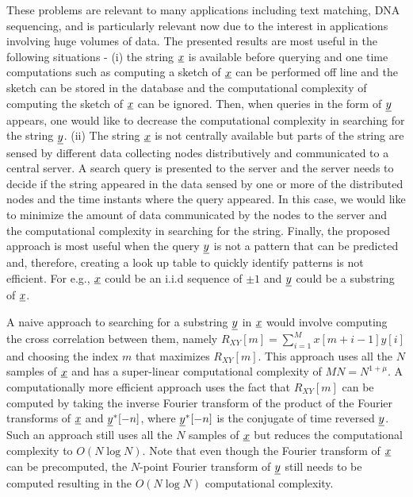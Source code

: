 These problems are relevant to many applications including text matching, DNA sequencing, and is particularly relevant now due to the interest in applications involving huge volumes of data. The presented results are most useful in the following situations - (i) the string $\underline{x}$ is available before querying and one time computations such as computing a sketch of $\underline{x}$ can be performed off line and the sketch can be stored in the database and the computational complexity of computing the sketch of $\underline{x}$ can be ignored. Then, when queries in the form of $\underline{y}$ appears, one would like to decrease the computational complexity in searching for the string $\underline{y}$. (ii) The string $\underline{x}$ is not centrally available but parts of the string are sensed by different data collecting nodes distributively and communicated to a central server. A search query is presented to the server and the server needs to decide if the string appeared in the data sensed by one or more of the distributed nodes and the time instants where the query appeared. In this case, we would like to minimize the amount of data communicated by the nodes to the server and the computational complexity in searching for the string.
Finally, the proposed approach is most useful when the query $\underline{y}$ is not a pattern that can be predicted and, therefore, creating a look up table to quickly identify patterns is not efficient. For e.g., $\underline{x}$ could be an i.i.d sequence of $\pm 1$ and $\underline{y}$ could be a substring of $\underline{x}$.

A naive approach to searching for a substring $\underline{y}$ in $\underline{x}$ would involve computing the cross correlation between them, namely $R_{XY}[m] = \sum_{i=1}^{M} x[m+i-1] y[i]$ and choosing the index $m$ that maximizes $R_{XY}[m]$. This approach uses all the $N$ samples of $\underline{x}$ and has a super-linear computational complexity of $MN = N^{1+\mu}$. A computationally more efficient approach uses the fact that $R_{XY}[m]$ can be computed by taking the inverse Fourier transform of the product of the Fourier transforms of $\underline{x}$ and $ \underline{y}^*[-n]$, where $\underline{y}^*[-n]$ is the conjugate of time reversed $\underline{y}$. Such an approach still uses all the $N$ samples of $\underline{x}$ but reduces the computational complexity to $O(N \log N)$. Note that even though the Fourier transform of $\underline{x}$ can be precomputed, the $N$-point Fourier transform of $\underline{y}$ still needs to be computed resulting in the $O(N \log N)$ computational complexity.

